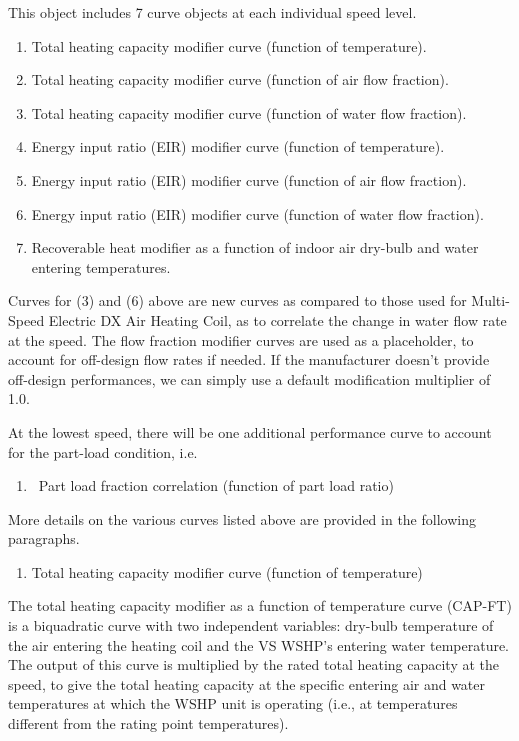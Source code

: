 This object includes 7 curve objects at each individual speed level.

\begin{enumerate}
\def\labelenumi{\arabic{enumi})}
\item Total heating capacity modifier curve (function of temperature).
\item Total heating capacity modifier curve (function of air flow fraction).
\item Total heating capacity modifier curve (function of water flow fraction).
\item Energy input ratio (EIR) modifier curve (function of temperature).
\item Energy input ratio (EIR) modifier curve (function of air flow fraction).
\item Energy input ratio (EIR) modifier curve (function of water flow fraction).
\item Recoverable heat modifier as a function of indoor air dry-bulb and water entering temperatures.
\end{enumerate}

Curves for (3) and (6) above are new curves as compared to those used for Multi-Speed Electric DX Air Heating Coil, as to correlate the change in water flow rate at the speed. The flow fraction modifier curves are used as a placeholder, to account for off-design flow rates if needed. If the manufacturer doesn't provide off-design performances, we can simply use a default modification multiplier of 1.0.

At the lowest speed, there will be one additional performance curve to account for the part-load condition, i.e.

\begin{enumerate}
\def\labelenumi{\arabic{enumi})}
\setcounter{enumi}{7}
\item
  ~Part load fraction correlation (function of part load ratio)
\end{enumerate}

More details on the various curves listed above are provided in the following paragraphs.

\begin{enumerate}
\def\labelenumi{\arabic{enumi})}
\item Total heating capacity modifier curve (function of temperature)
\end{enumerate}

The total heating capacity modifier as a function of temperature curve (CAP-FT) is a biquadratic curve with two independent variables: dry-bulb temperature of the air entering the heating coil and the VS WSHP's entering water temperature. The output of this curve is multiplied by the rated total heating capacity at the speed, to give the total heating capacity at the specific entering air and water temperatures at which the WSHP unit is operating (i.e., at temperatures different from the rating point temperatures).

